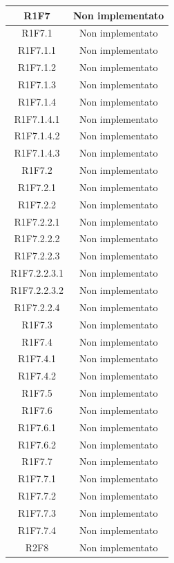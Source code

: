 \begin{longtable}{|c|c|}
	\hline
	{R1F7} & Non implementato\\
	\hline
	{R1F7.1} & Non implementato\\
	\hline
	{R1F7.1.1} & Non implementato\\
	\hline
	{R1F7.1.2} & Non implementato\\
	\hline
	{R1F7.1.3} & Non implementato\\
	\hline
	{R1F7.1.4} & Non implementato\\
	\hline
	{R1F7.1.4.1} & Non implementato\\
	\hline
	{R1F7.1.4.2} & Non implementato\\
	\hline
	{R1F7.1.4.3} & Non implementato\\
	\hline
	{R1F7.2} & Non implementato\\
	\hline
	{R1F7.2.1} & Non implementato\\
	\hline
	{R1F7.2.2} & Non implementato\\
	\hline
	{R1F7.2.2.1} & Non implementato\\
	\hline
	{R1F7.2.2.2} & Non implementato\\
	\hline
	{R1F7.2.2.3} & Non implementato\\
	\hline
	{R1F7.2.2.3.1} & Non implementato\\
	\hline
	{R1F7.2.2.3.2} & Non implementato\\
	\hline
	{R1F7.2.2.4} & Non implementato\\
	\hline
	{R1F7.3} & Non implementato\\
	\hline
	{R1F7.4} & Non implementato\\
	\hline
	{R1F7.4.1} & Non implementato\\
	\hline
	{R1F7.4.2} & Non implementato\\
	\hline
	{R1F7.5} & Non implementato \\ 
	\hline
	{R1F7.6} & Non implementato\\
	\hline
	{R1F7.6.1} & Non implementato\\
	\hline
	{R1F7.6.2} & Non implementato\\
	\hline
	{R1F7.7} & Non implementato\\
	\hline
	{R1F7.7.1} & Non implementato\\
	\hline
	{R1F7.7.2} & Non implementato\\
	\hline
	{R1F7.7.3} & Non implementato\\
	\hline
	{R1F7.7.4} & Non implementato\\
	\hline
	{R2F8} & Non implementato\\
	\hline

\end{longtable}
